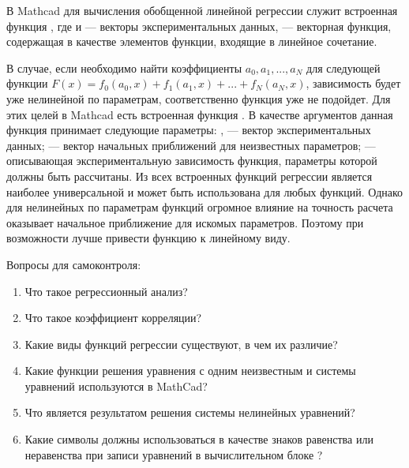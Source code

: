 В Mathcad для вычисления обобщенной линейной регрессии служит встроенная функция , где  и  --- векторы экспериментальных данных,  --- векторная функция, содержащая в качестве элементов функции, входящие в линейное сочетание.


В случае, если необходимо найти коэффициенты $a_0, a_1, ..., a_N$ для следующей функции $F(x)= f_0(a_0, x) + f_1(a_1,x) +... + f_N(a_N,x)$, зависимость будет уже нелинейной по параметрам, соответственно функция  уже не подойдет. Для этих целей в Mathcad есть встроенная функция . В качестве аргументов данная функция принимает следующие параметры: ,  --- вектор экспериментальных данных;  --- вектор начальных приближений для неизвестных параметров;
 --- описывающая экспериментальную зависимость функция, параметры которой должны быть рассчитаны. 
\primer{}
Из всех встроенных функций регрессии  является наиболее универсальной и может быть использована для любых функций. Однако для нелинейных по параметрам функций огромное влияние на точность расчета оказывает начальное приближение   для искомых параметров. Поэтому при возможности лучше привести функцию к линейному виду.

Вопросы для самоконтроля:
\begin{enumerate}
\item Что такое регрессионный анализ?
\item Что такое коэффициент корреляции?
\item Какие виды функций регрессии существуют, в чем их различие?
\item Какие функции решения уравнения с одним неизвестным и системы уравнений используются в MathCad?
\item Что является результатом решения системы нелинейных уравнений?
\item Какие символы должны использоваться в качестве знаков равенства или неравенства при записи уравнений в вычислительном блоке ?
\end{enumerate}
